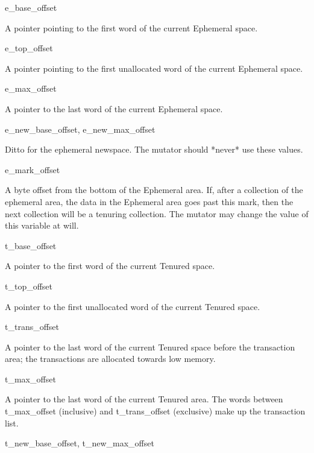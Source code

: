 \begin{description}

\item {\sc e\_base\_offset}

A pointer pointing to the first word of the current Ephemeral space.

\item {\sc e\_top\_offset}

A pointer pointing to the first unallocated word of the
current Ephemeral space.

\item {\sc e\_max\_offset}

A pointer to the last word of the current Ephemeral space.

\item {\sc e\_new\_base\_offset, e\_new\_max\_offset }

Ditto for the ephemeral newspace. The mutator should *never* use these values.

\item {\sc e\_mark\_offset}

 A byte offset from the bottom of the Ephemeral area. If, after
 a collection of the ephemeral area, the data in the Ephemeral
 area goes past this mark, then the next collection will be a
 tenuring collection. The mutator may change the value of this
 variable at will.

\item {\sc t\_base\_offset}

 A pointer to the first word of the current Tenured space.

\item {\sc t\_top\_offset}

 A pointer to the first unallocated word of the current Tenured space.

\item {\sc t\_trans\_offset}

 A pointer to the last word of the current Tenured space
 before the transaction area; the transactions are allocated
 towards low memory.

\item {\sc t\_max\_offset}

 A pointer to the last word of the current Tenured area.
 The words between {\sc t\_max\_offset} (inclusive) and 
 {\sc t\_trans\_offset} (exclusive) make up the transaction list.

\item {\sc t\_new\_base\_offset, t\_new\_max\_offset}


\end{description}
